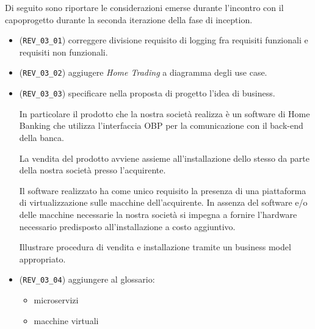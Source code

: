 \documentclass[a4paper,11pt]{texmemo}
\newcommand{\code}[1]{\texttt{#1}}
\begin{document}
\maketitle

Di seguito sono riportare le considerazioni emerse durante l'incontro con il capoprogetto durante la seconda iterazione della fase di inception.

\begin{itemize}
	\item (\code{REV\_03\_01}) correggere divisione requisito di logging fra requisiti funzionali e requisiti non funzionali.
	\item (\code{REV\_03\_02}) aggiugere \emph{Home Trading} a diagramma degli use case.
	\item (\code{REV\_03\_03}) specificare nella proposta di progetto l'idea di business.

		In particolare il prodotto che la nostra societ\`a realizza \`e un software di Home Banking che utilizza l'interfaccia OBP per la comunicazione con il back-end della banca.

		La vendita del prodotto avviene assieme all'installazione dello stesso da parte della nostra societ\`a presso l'acquirente.

		Il software realizzato ha come unico requisito la presenza di una piattaforma di virtualizzazione sulle macchine dell'acquirente.
		In assenza del software e/o delle macchine necessarie la nostra societ\`a si impegna a fornire l'hardware necessario predisposto all'installazione a costo aggiuntivo.

		Illustrare procedura di vendita e installazione tramite un business model appropriato.
	\item (\code{REV\_03\_04}) aggiungere al glossario:
		\begin{itemize}
			\item microservizi
			\item macchine virtuali
		\end{itemize}
\end{itemize}
\end{document}
